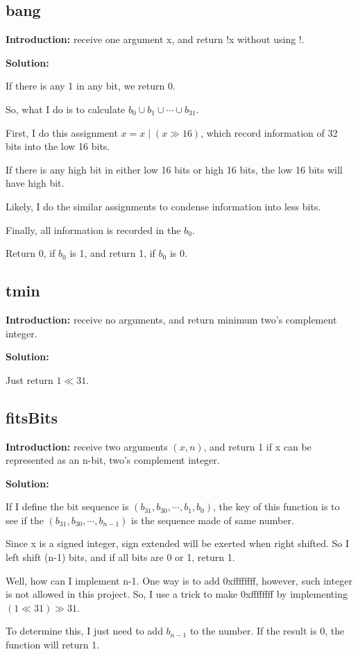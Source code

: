 \documentclass[12pt,a4paper]{article}
\theoremstyle{definition}
\numberwithin{equation}{section}
\numberwithin{figure}{section}
\begin{document}
\begin{spacing}{1.5}
\subsection{bang}
\textbf{Introduction: }receive one argument x, and return !x without using !.\par
\textbf{Solution: }\par
If there is any 1 in any bit, we return 0.\par
So, what I do is to calculate $b_0 \cup b_1 \cup \cdots \cup b_{31}$.\par
First, I do this assignment $x = x \mid \left(x \gg 16\right)$, which record information of 32 bits into the low 16 bits.\par
If there is any high bit in either low 16 bits or high 16 bits, the low 16 bits will have high bit.\par
Likely, I do the similar assignments to condense information into less bits.\par
Finally, all information is recorded in the $b_0$.\par
Return 0, if $b_0$ is 1, and return 1, if $b_0$ is 0.\par

\subsection{tmin}
\textbf{Introduction: }receive no arguments, and return minimum two's complement integer.\par
\textbf{Solution: }\par
Just return $1 \ll 31$.\par

\subsection{fitsBits}
\textbf{Introduction: }receive two arguments $\left(x, n\right)$, and return 1 if x can be represented as an n-bit, two's complement integer.\par
\textbf{Solution: }\par
If I define the bit sequence is $\left(b_{31},b_{30},\cdots,b_1,b_0\right)$, the key of this function is to see if the $\left(b_{31},b_{30},\cdots,b_{n-1}\right)$ is the sequence made of same number.\par
Since x is a signed integer, sign extended will be exerted when right shifted. So I left shift (n-1) bits, and if all bits are 0 or 1, return 1.\par
Well, how can I implement n-1. One way is to add 0xffffffff, however, such integer is not allowed in this project. So, I use a trick to make 0xffffffff by implementing $\left(1 \ll 31\right) \gg 31$.\par
To determine this, I just need to add $b_{n-1}$ to the number. If the result is 0, the function will return 1.\par


\end{spacing}
\end{document}

